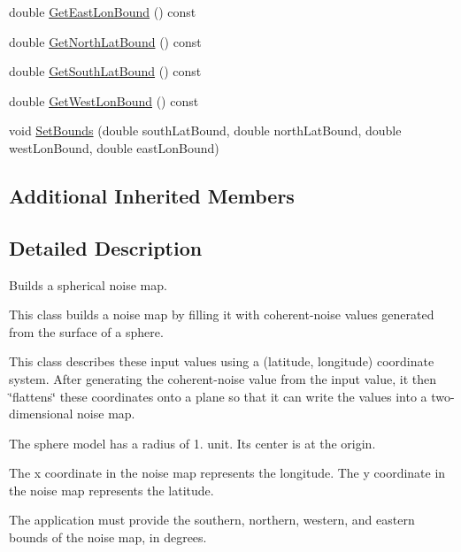 \begin{DoxyCompactItemize}
double \hyperlink{classnoise_1_1utils_1_1_noise_map_builder_sphere_a147b825ed70509ae4915cf58dcbc5849}{Get\+East\+Lon\+Bound} () const 
\item 
double \hyperlink{classnoise_1_1utils_1_1_noise_map_builder_sphere_a3a57e009f39f48a464ea0edc2beb4241}{Get\+North\+Lat\+Bound} () const 
\item 
double \hyperlink{classnoise_1_1utils_1_1_noise_map_builder_sphere_a8a4c78a1a4d6b659e721fabdf3f5f47f}{Get\+South\+Lat\+Bound} () const 
\item 
double \hyperlink{classnoise_1_1utils_1_1_noise_map_builder_sphere_aef51b39b7fbd0a010e17e47bff877ae1}{Get\+West\+Lon\+Bound} () const 
\item 
void \hyperlink{classnoise_1_1utils_1_1_noise_map_builder_sphere_ad2f19622ba12bc8ee715b2d070bfaf09}{Set\+Bounds} (double south\+Lat\+Bound, double north\+Lat\+Bound, double west\+Lon\+Bound, double east\+Lon\+Bound)
\end{DoxyCompactItemize}
\subsection*{Additional Inherited Members}


\subsection{Detailed Description}
Builds a spherical noise map.

This class builds a noise map by filling it with coherent-\/noise values generated from the surface of a sphere.

This class describes these input values using a (latitude, longitude) coordinate system. After generating the coherent-\/noise value from the input value, it then \char`\"{}flattens\char`\"{} these coordinates onto a plane so that it can write the values into a two-\/dimensional noise map.

The sphere model has a radius of 1. unit. Its center is at the origin.

The x coordinate in the noise map represents the longitude. The y coordinate in the noise map represents the latitude.

The application must provide the southern, northern, western, and eastern bounds of the noise map, in degrees. 

